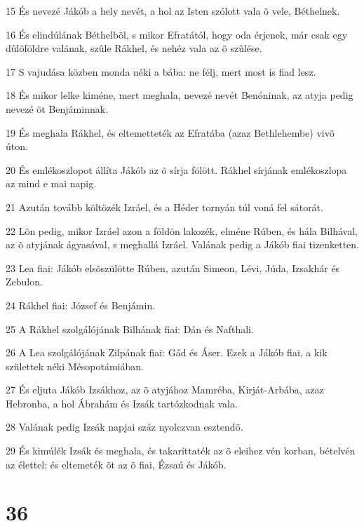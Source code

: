 \par 15 És nevezé Jákób a hely nevét, a hol az Isten szólott vala õ vele, Béthelnek.
\par 16 És elindúlának Béthelbõl, s mikor Efratától, hogy oda érjenek, már csak egy dûlõföldre valának, szûle Rákhel, és nehéz vala az õ szûlése.
\par 17 S vajudása közben monda néki a bába: ne félj, mert most is fiad lesz.
\par 18 És mikor lelke kiméne, mert meghala, nevezé nevét Benóninak, az atyja pedig nevezé õt Benjáminnak.
\par 19 És meghala Rákhel, és eltemetteték az Efratába (azaz Bethlehembe) vivõ úton.
\par 20 És emlékoszlopot állíta Jákób az õ sírja fölött. Rákhel sírjának emlékoszlopa az mind e mai napig.
\par 21 Azután tovább költözék Izráel, és a Héder tornyán túl voná fel sátorát.
\par 22 Lõn pedig, mikor Izráel azon a földön lakozék, elméne Rúben, és hála Bilhával, az õ atyjának ágyasával, s meghallá Izráel. Valának pedig a Jákób fiai tizenketten.
\par 23 Lea fiai: Jákób elsõszülötte Rúben, azután Simeon, Lévi, Júda, Izsakhár és Zebulon.
\par 24 Rákhel fiai: József és Benjámin.
\par 25 A Rákhel szolgálójának Bilhának fiai: Dán és Nafthali.
\par 26 A Lea szolgálójának Zilpának fiai: Gád és Áser. Ezek a Jákób fiai, a kik születtek néki Mésopotámiában.
\par 27 És eljuta Jákób Izsákhoz, az õ atyjához Mamréba, Kirját-Arbába, azaz Hebronba, a hol Ábrahám és Izsák tartózkodnak vala.
\par 28 Valának pedig Izsák napjai száz nyolczvan esztendõ.
\par 29 És kimúlék Izsák és meghala, és takaríttaték az õ eleihez vén korban, bételvén az élettel; és eltemeték õt az õ fiai, Ézsaú és Jákób.

\chapter{36}

